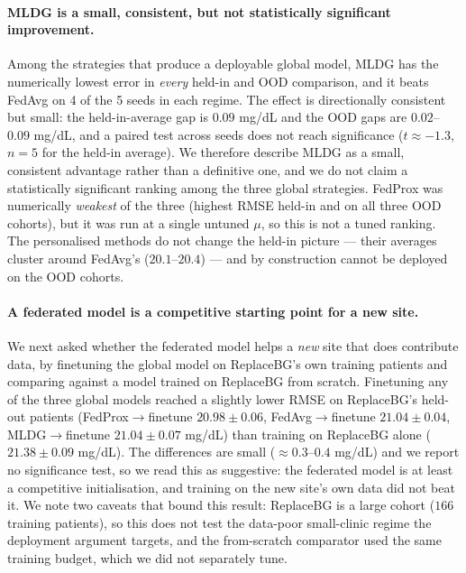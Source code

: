 \documentclass[10pt,letterpaper]{article}
\begin{document}
\paragraph{MLDG is a small, consistent, but not statistically significant
improvement.} Among the strategies that produce a deployable global model, MLDG
has the numerically lowest error in \emph{every} held-in and OOD comparison, and
it beats FedAvg on 4 of the 5 seeds in each regime. The effect is directionally
consistent but small: the held-in-average gap is $0.09$ mg/dL and the OOD gaps
are $0.02$--$0.09$ mg/dL, and a paired test across seeds does not reach
significance ($t \approx -1.3$, $n=5$ for the held-in average). We therefore
describe MLDG as a small, consistent advantage rather than a definitive one, and
we do not claim a statistically significant ranking among the three global
strategies. FedProx was numerically \emph{weakest} of the three (highest RMSE
held-in and on all three OOD cohorts), but it was run at a single untuned $\mu$,
so this is not a tuned ranking. The personalised methods do not change the
held-in picture --- their averages cluster around FedAvg's ($20.1$--$20.4$) ---
and by construction cannot be deployed on the OOD cohorts.

\paragraph{A federated model is a competitive starting point for a new site.} We
next asked whether the federated model helps a \emph{new} site that does
contribute data, by finetuning the global model on ReplaceBG's own training
patients and comparing against a model trained on ReplaceBG from scratch.
Finetuning any of the three global models reached a slightly lower RMSE on
ReplaceBG's held-out patients (FedProx$\rightarrow$finetune $20.98 \pm 0.06$,
FedAvg$\rightarrow$finetune $21.04 \pm 0.04$, MLDG$\rightarrow$finetune
$21.04 \pm 0.07$ mg/dL) than training on ReplaceBG alone
($21.38 \pm 0.09$ mg/dL). The differences are small ($\approx 0.3$--$0.4$ mg/dL)
and we report no significance test, so we read this as suggestive: the federated
model is at least a competitive initialisation, and training on the new site's
own data did not beat it. We note two caveats that bound this result: ReplaceBG
is a large cohort ($166$ training patients), so this does not test the
data-poor small-clinic regime the deployment argument targets, and the
from-scratch comparator used the same training budget, which we did not
separately tune.
\end{document}
